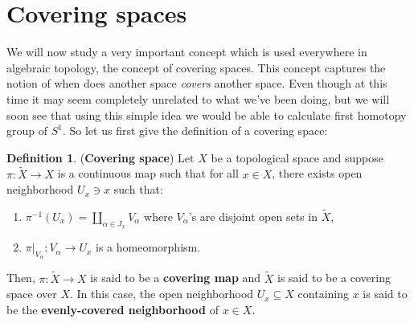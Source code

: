 \documentclass[letterpaper,11pt,twoside]{article}
\theoremstyle{definition}
\theoremstyle{definition}
\newtheorem{definition}[proposition]{Definition}
\theoremstyle{definition}
\theoremstyle{definition}
\theoremstyle{definition}
\theoremstyle{definition}
\theoremstyle{remark}
\theoremstyle{definition}
\newcommand{\rest}[2]{\left. { #1 }\right \vert_{#2}}
\begin{document}
\section{Covering spaces}
We will now study a very important concept which is used everywhere in algebraic topology, the concept of covering spaces. This concept captures the notion of when does another space \textit{covers} another space. Even though at this time it may seem completely unrelated to what we've been doing, but we will soon see that using this simple idea we would be able to calculate first homotopy group of $S^1$. So let us first give the definition of a covering space:
\begin{definition}
(\textbf{Covering space}) Let $X$ be a topological space and suppose $\pi : \tilde{X} \to X$ is a continuous map such that for all $x\in X$, there exists open neighborhood $U_x \ni x$ such that:
\begin{enumerate}
    \item {$\pi^{-1}(U_x) = \coprod_{\alpha \in J_x} V_\alpha$ where $V_\alpha$'s are disjoint open sets in $\tilde{X}$,}
    \item {$\rest{\pi}{V_\alpha} : V_\alpha \to U_x$ is a homeomorphism.}
\end{enumerate}
Then, $\pi : \tilde{X} \to X$ is said to be a \textbf{covering map} and $\tilde{X}$ is said to be a covering space over $X$. In this case, the open neighborhood $U_x\subseteq X$ containing $x$ is said to be the \textbf{evenly-covered neighborhood} of $x\in X$.
\begin{figure}[h!]
    \centering
    




\begin{tikzpicture}[x=0.75pt,y=0.75pt,yscale=-1,xscale=1]


\end{tikzpicture}
\end{figure}
\end{definition}
\end{document}
